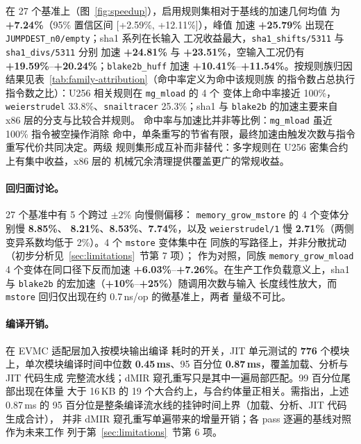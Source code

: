 在 27 个基准上（图~\ref{fig:speedup}），启用规则集相对于基线的加速几何均值
为 \textbf{+7.24\%}（95\% 置信区间 [+2.59\%, +12.11\%]），峰值
加速 \textbf{+25.79\%} 出现在 \texttt{JUMPDEST\_n0/empty}；sha1 系列在长输入
工况收益最大，\texttt{sha1\_shifts/5311} 与 \texttt{sha1\_divs/5311} 分别
加速 \textbf{+24.81\%} 与 \textbf{+23.51\%}，空输入工况仍有
\textbf{+19.59\%}--\textbf{+20.24\%}；\texttt{blake2b\_huff} 加速
\textbf{+10.41\%}--\textbf{+11.54\%}。按规则族归因结果见表~\ref{tab:family-attribution}（命中率定义为命中该规则族
的指令数占总执行指令数之比）：U256 相关规则在 \texttt{mg\_mload} 的 4 个
变体上命中率接近 100\%，\texttt{weierstrudel} 33.8\%、\texttt{snailtracer}
25.3\%；sha1 与 \texttt{blake2b} 的加速主要来自 x86 层的分支与比较合并规则。
命中率与加速比并非等比例：\texttt{mg\_mload} 虽近 100\% 指令被空操作消除
命中，单条重写的节省有限，最终加速由触发次数与指令重写代价共同决定。两级
规则集形成互补而非替代：多字规则在 U256 密集合约上有集中收益，x86 层的
机械冗余清理提供覆盖更广的常规收益。

\paragraph{回归面讨论。}27 个基准中有 5 个跨过 $\pm 2\%$ 向慢侧偏移：
\texttt{memory\_grow\_mstore} 的 4 个变体分别慢 \textbf{8.85\%}、
\textbf{8.21\%}、\textbf{8.53\%}、\textbf{7.74\%}，以及 \texttt{weierstrudel/1}
慢 \textbf{2.71\%}（两侧变异系数均低于 2\%）。4 个 \texttt{mstore} 变体集中在
同族的写路径上，并非分散扰动（初步分析见~\ref{sec:limitations}~节第 7 项）；
作为对照，同族 \texttt{memory\_grow\_mload} 4 个变体在同口径下反而加速
\textbf{+6.03\%}--\textbf{+7.26\%}。在生产工作负载意义上，sha1 与
\texttt{blake2b} 的宏加速（\textbf{+10\%}--\textbf{+25\%}）随调用次数与输入
长度线性放大，而 \texttt{mstore} 回归仅出现在约 0.7\,ns/op 的微基准上，两者
量级不可比。

\paragraph{编译开销。}在 EVMC 适配层加入按模块输出编译
耗时的开关，JIT 单元测试的 \textbf{776} 个模块上，单次模块编译时间中位数
\textbf{0.45\,ms}、95 百分位 \textbf{0.87\,ms}，覆盖加载、分析与 JIT 代码生成
完整流水线；dMIR 窥孔重写只是其中一遍局部匹配。99 百分位尾部出现在体量
大于 16\,KB 的 19 个大合约上，与合约体量正相关。需指出，上述 0.87\,ms 的
95 百分位是整条编译流水线的挂钟时间上界（加载、分析、JIT 代码生成合计），
并非 dMIR 窥孔重写单遍带来的增量开销；各 pass 逐遍的基线对照作为未来工作
列于第~\ref{sec:limitations}~节第 6 项。

